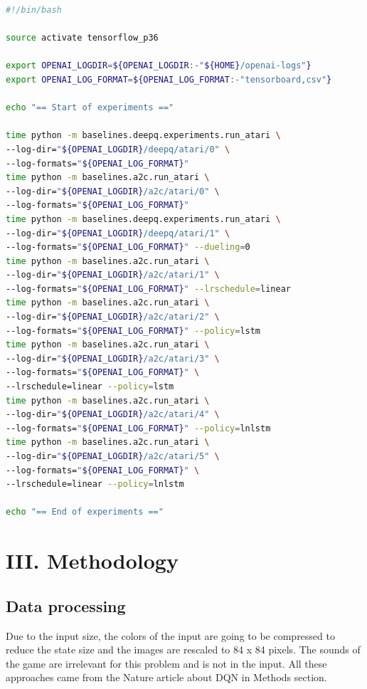 \documentclass[11pt,twoside,a4paper]{article}
\begin{document}
\begin{lstlisting}[language=bash,caption={bash version}]
#!/bin/bash

source activate tensorflow_p36

export OPENAI_LOGDIR=${OPENAI_LOGDIR:-"${HOME}/openai-logs"}
export OPENAI_LOG_FORMAT=${OPENAI_LOG_FORMAT:-"tensorboard,csv"}

echo "== Start of experiments =="

time python -m baselines.deepq.experiments.run_atari \
--log-dir="${OPENAI_LOGDIR}/deepq/atari/0" \
--log-formats="${OPENAI_LOG_FORMAT}"
time python -m baselines.a2c.run_atari \
--log-dir="${OPENAI_LOGDIR}/a2c/atari/0" \
--log-formats="${OPENAI_LOG_FORMAT}"
time python -m baselines.deepq.experiments.run_atari \
--log-dir="${OPENAI_LOGDIR}/deepq/atari/1" \
--log-formats="${OPENAI_LOG_FORMAT}" --dueling=0
time python -m baselines.a2c.run_atari \
--log-dir="${OPENAI_LOGDIR}/a2c/atari/1" \
--log-formats="${OPENAI_LOG_FORMAT}" --lrschedule=linear
time python -m baselines.a2c.run_atari \
--log-dir="${OPENAI_LOGDIR}/a2c/atari/2" \
--log-formats="${OPENAI_LOG_FORMAT}" --policy=lstm
time python -m baselines.a2c.run_atari \
--log-dir="${OPENAI_LOGDIR}/a2c/atari/3" \
--log-formats="${OPENAI_LOG_FORMAT}" \
--lrschedule=linear --policy=lstm
time python -m baselines.a2c.run_atari \
--log-dir="${OPENAI_LOGDIR}/a2c/atari/4" \
--log-formats="${OPENAI_LOG_FORMAT}" --policy=lnlstm
time python -m baselines.a2c.run_atari \
--log-dir="${OPENAI_LOGDIR}/a2c/atari/5" \
--log-formats="${OPENAI_LOG_FORMAT}" \
--lrschedule=linear --policy=lnlstm

echo "== End of experiments =="
\end{lstlisting}

\section*{III. Methodology}

\subsection*{Data processing}

Due to the input size, the colors of the input are going to be compressed to
reduce the state size and the images are rescaled to 84 x 84 pixels. The sounds
of the game are irrelevant for this problem and is not in the input. All these
approaches came from the Nature article about DQN\cite{mnih2015humanlevel} in
Methods section.
\end{document}
